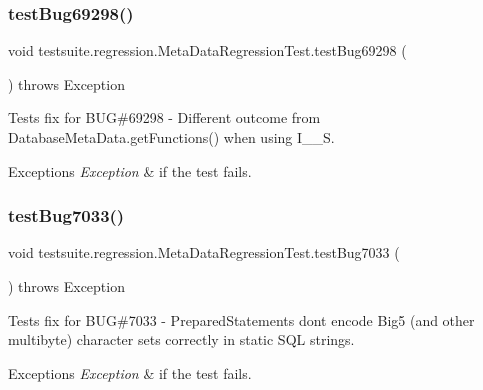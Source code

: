 \subsubsection{\texorpdfstring{test\+Bug69298()}{testBug69298()}}
{\footnotesize\ttfamily void testsuite.\+regression.\+Meta\+Data\+Regression\+Test.\+test\+Bug69298 (\begin{DoxyParamCaption}{ }\end{DoxyParamCaption}) throws Exception}

Tests fix for B\+UG\#69298 -\/ Different outcome from Database\+Meta\+Data.\+get\+Functions() when using I\+\_\+\+\_\+S.


\begin{DoxyExceptions}{Exceptions}
{\em Exception} & if the test fails. \\
\hline
\end{DoxyExceptions}
\mbox{\label{classtestsuite_1_1regression_1_1_meta_data_regression_test_a810a4101f87e44b30caa45239a86b4d5}} 
\subsubsection{\texorpdfstring{test\+Bug7033()}{testBug7033()}}
{\footnotesize\ttfamily void testsuite.\+regression.\+Meta\+Data\+Regression\+Test.\+test\+Bug7033 (\begin{DoxyParamCaption}{ }\end{DoxyParamCaption}) throws Exception}

Tests fix for B\+UG\#7033 -\/ Prepared\+Statements don\textquotesingle{}t encode Big5 (and other multibyte) character sets correctly in static S\+QL strings.


\begin{DoxyExceptions}{Exceptions}
{\em Exception} & if the test fails. \\
\hline
\end{DoxyExceptions}
\mbox{\label{classtestsuite_1_1regression_1_1_meta_data_regression_test_af6e2170c6b9b3b1ff9beddf8dc1c2aa9}} 
